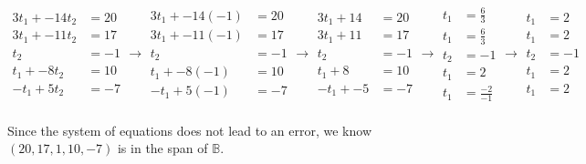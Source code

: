 \documentclass{article}
\begin{document}
\begin{equation*}
\begin{split}
3t_1 + -14t_2 &= 20\\
3t_1 + -11t_2 &= 17\\
t_2 &= -1\\
t_1 + -8t_2 &= 10\\
-t_1 + 5t_2 &= -7
\end{split}
\xrightarrow{}
\begin{split}
3t_1 + -14(-1) &= 20\\
3t_1 + -11(-1) &= 17\\
t_2 &= -1\\
t_1 + -8(-1) &= 10\\
-t_1 + 5(-1) &= -7
\end{split}
\xrightarrow{}
\begin{split}
3t_1 + 14 &= 20\\
3t_1 + 11 &= 17\\
t_2 &= -1\\
t_1 + 8 &= 10\\
-t_1 + -5 &= -7
\end{split}
\xrightarrow{}
\begin{split}
t_1 &= \frac{6}{3}\\
t_1 &= \frac{6}{3}\\
t_2 &= -1\\
t_1 &= 2\\
t_1 &= \frac{-2}{-1}
\end{split}
\xrightarrow{}
\begin{split}
t_1 &= 2\\
t_1 &= 2\\
t_2 &= -1\\
t_1 &= 2\\
t_1 &= 2
\end{split}
\end{equation*}\\
Since the system of equations does not lead to an error, we know $(20, 17, 1,
10, -7)$ is in the span of $\mathbb{B}$.\\
\newpage
\end{document}
